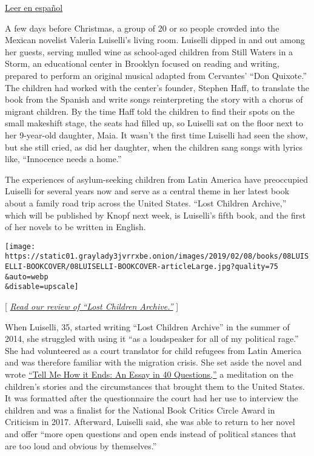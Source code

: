 \href{https://www.nytimes3xbfgragh.onion/es/2019/02/07/valeria-luiselli-entrevista/}{Leer
en español}

A few days before Christmas, a group of 20 or so people crowded into the
Mexican novelist Valeria Luiselli's living room. Luiselli dipped in and
out among her guests, serving mulled wine as school-aged children from
Still Waters in a Storm, an educational center in Brooklyn focused on
reading and writing, prepared to perform an original musical adapted
from Cervantes' ``Don Quixote.'' The children had worked with the
center's founder, Stephen Haff, to translate the book from the Spanish
and write songs reinterpreting the story with a chorus of migrant
children. By the time Haff told the children to find their spots on the
small makeshift stage, the seats had filled up, so Luiselli sat on the
floor next to her 9-year-old daughter, Maia. It wasn't the first time
Luiselli had seen the show, but she still cried, as did her daughter,
when the children sang songs with lyrics like, ``Innocence needs a
home.''

The experiences of asylum-seeking children from Latin America have
preoccupied Luiselli for several years now and serve as a central theme
in her latest book about a family road trip across the United States.
``Lost Children Archive,'' which will be published by Knopf next week,
is Luiselli's fifth book, and the first of her novels to be written in
English.

\texttt{[image: https://static01.graylady3jvrrxbe.onion/images/2019/02/08/books/08LUISELLI-BOOKCOVER/08LUISELLI-BOOKCOVER-articleLarge.jpg?quality=75\\\&auto=webp\\\&disable=upscale]}

{[}
\href{https://www.nytimes3xbfgragh.onion/2019/02/11/books/review-lost-children-archive-valeria-luiselli.html}{\emph{Read
our review of ``Lost Children Archive.''}} {]}

When Luiselli, 35, started writing ``Lost Children Archive'' in the
summer of 2014, she struggled with using it ``as a loudspeaker for all
of my political rage.'' She had volunteered as a court translator for
child refugees from Latin America and was therefore familiar with the
migration crisis. She set aside the novel and wrote
\href{https://www.nytimes3xbfgragh.onion/2017/04/28/books/review/tell-me-how-it-ends-valeria-luiselli.html}{``Tell
Me How it Ends: An Essay in 40 Questions,''} a meditation on the
children's stories and the circumstances that brought them to the United
States. It was formatted after the questionnaire the court had her use
to interview the children and was a finalist for the National Book
Critics Circle Award in Criticism in 2017. Afterward, Luiselli said, she
was able to return to her novel and offer ``more open questions and open
ends instead of political stances that are too loud and obvious by
themselves.''

